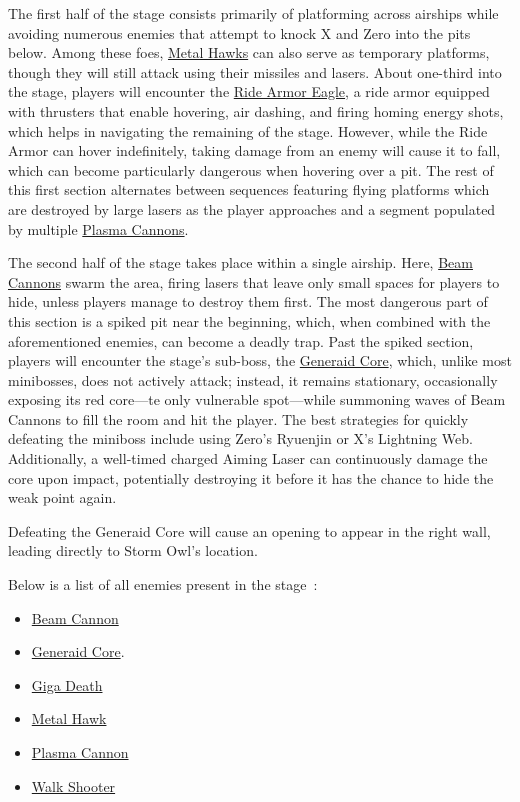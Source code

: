 The first half of the stage consists primarily of platforming across airships while avoiding numerous enemies that attempt to knock X and Zero into the pits below. Among these foes, \hyperlink{enem:Metal_Hawk}{Metal Hawks} can also serve as temporary platforms, though they will still attack  using their missiles and lasers. About one-third into the stage, players will encounter the \hyperlink{vehicle:Ride_Armor_Eagle}{Ride Armor Eagle}, a ride armor equipped with thrusters that enable hovering, air dashing, and firing homing energy shots, which helps in navigating the remaining of the stage. However, while the Ride Armor can hover indefinitely, taking damage from an enemy will cause it to fall, which can become particularly dangerous when hovering over a pit.  The rest of this first section alternates between sequences featuring flying platforms which are destroyed by large lasers as the player approaches and a segment populated by multiple \hyperlink{enem:Plasma_Cannon}{Plasma Cannons}.  

The second half of the stage takes place within a single airship. Here, \hyperlink{enem:Beam_Cannon}{Beam Cannons} swarm the area, firing lasers that leave only small spaces for players to hide, unless players manage to destroy them first. The most dangerous part of this section is a spiked pit near the beginning, which, when combined with the aforementioned enemies, can become a deadly trap. Past the spiked section, players will encounter the stage's sub-boss, the \hyperlink{miniboss:Generaid_Core}{Generaid Core}, which, unlike most minibosses, does not actively attack; instead, it remains stationary, occasionally exposing its red core—te only vulnerable spot—while summoning waves of Beam Cannons to fill the room and hit the player. The best strategies for quickly defeating the miniboss include using Zero's Ryuenjin or X's Lightning Web. Additionally, a well-timed charged Aiming Laser can continuously damage the core upon impact, potentially destroying it before it has the chance to hide the weak point again.  

Defeating the Generaid Core will cause an opening to appear in the right wall, leading directly to Storm Owl's location.  

Below is a list of all enemies present in the stage~\cite{wiki:Airforce}:
\begin{itemize}
	\item \hyperlink{enem:Beam_Cannon}{Beam Cannon}
	\item \hyperlink{miniboss:Generaid_Core}{Generaid Core}.  
	\item \hyperlink{enem:Giga_Death}{Giga Death}
	\item \hyperlink{enem:Metal_Hawk}{Metal Hawk}
	\item \hyperlink{enem:Plasma_Cannon}{Plasma Cannon}
	\item \hyperlink{enem:Walk_Shooter}{Walk Shooter}
\end{itemize}


